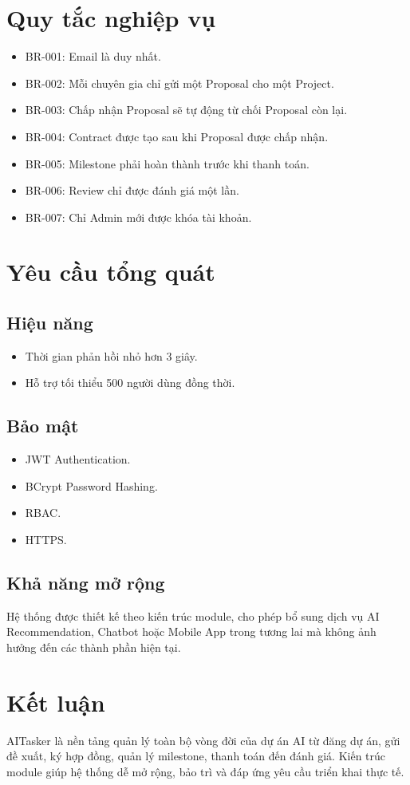 \section{Quy tắc nghiệp vụ}

\begin{itemize}
\item BR-001: Email là duy nhất.
\item BR-002: Mỗi chuyên gia chỉ gửi một Proposal cho một Project.
\item BR-003: Chấp nhận Proposal sẽ tự động từ chối Proposal còn lại.
\item BR-004: Contract được tạo sau khi Proposal được chấp nhận.
\item BR-005: Milestone phải hoàn thành trước khi thanh toán.
\item BR-006: Review chỉ được đánh giá một lần.
\item BR-007: Chỉ Admin mới được khóa tài khoản.
\end{itemize}

\section{Yêu cầu tổng quát}

\subsection{Hiệu năng}

\begin{itemize}
\item Thời gian phản hồi nhỏ hơn 3 giây.
\item Hỗ trợ tối thiểu 500 người dùng đồng thời.
\end{itemize}

\subsection{Bảo mật}

\begin{itemize}
\item JWT Authentication.
\item BCrypt Password Hashing.
\item RBAC.
\item HTTPS.
\end{itemize}

\subsection{Khả năng mở rộng}

Hệ thống được thiết kế theo kiến trúc module, cho phép bổ sung dịch vụ AI Recommendation, Chatbot hoặc Mobile App trong tương lai mà không ảnh hưởng đến các thành phần hiện tại.

\section{Kết luận}

AITasker là nền tảng quản lý toàn bộ vòng đời của dự án AI từ đăng dự án, gửi đề xuất, ký hợp đồng, quản lý milestone, thanh toán đến đánh giá. Kiến trúc module giúp hệ thống dễ mở rộng, bảo trì và đáp ứng yêu cầu triển khai thực tế.
